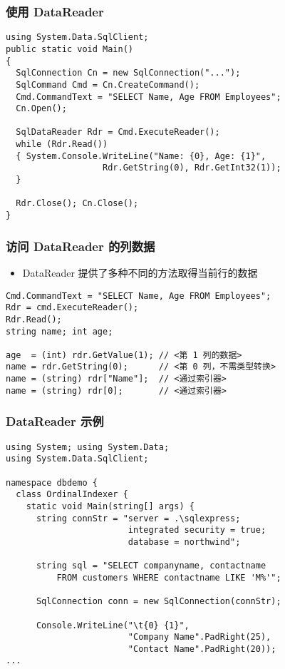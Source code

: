 \begin{frame}[fragile]
\frametitle{使用 DataReader}
\begin{lstlisting}
using System.Data.SqlClient;
public static void Main()
{ 
  SqlConnection Cn = new SqlConnection("...");
  SqlCommand Cmd = Cn.CreateCommand();
  Cmd.CommandText = "SELECT Name, Age FROM Employees";
  Cn.Open();

  SqlDataReader Rdr = Cmd.ExecuteReader();
  while (Rdr.Read())
  { System.Console.WriteLine("Name: {0}, Age: {1}",
                   Rdr.GetString(0), Rdr.GetInt32(1));
  }

  Rdr.Close(); Cn.Close();
}
\end{lstlisting}
\end{frame}

\begin{frame}[fragile]
\frametitle{访问 DataReader 的列数据}
\begin{itemize}
\item DataReader 提供了多种不同的方法取得当前行的数据
\end{itemize}
\begin{lstlisting}[escapeinside=<>]
Cmd.CommandText = "SELECT Name, Age FROM Employees";
Rdr = cmd.ExecuteReader();
Rdr.Read();
string name; int age;

age  = (int) rdr.GetValue(1); // <第 1 列的数据>
name = rdr.GetString(0);      // <第 0 列，不需类型转换>
name = (string) rdr["Name"];  // <通过索引器>
name = (string) rdr[0];       // <通过索引器>

\end{lstlisting}
\end{frame}

\begin{frame}[fragile]
\frametitle{DataReader 示例}
\begin{lstlisting}
using System; using System.Data;
using System.Data.SqlClient;

namespace dbdemo {
  class OrdinalIndexer {
    static void Main(string[] args) {
      string connStr = "server = .\sqlexpress;
                        integrated security = true;
                        database = northwind";

      string sql = "SELECT companyname, contactname
          FROM customers WHERE contactname LIKE 'M%'";

      SqlConnection conn = new SqlConnection(connStr);

      Console.WriteLine("\t{0} {1}",
                        "Company Name".PadRight(25),
                        "Contact Name".PadRight(20));
...
\end{lstlisting}
\end{frame}

